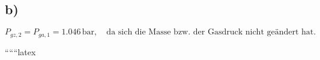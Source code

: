 

\subsection*{b)}

\[
P_{gz,2} = P_{ga,1} = 1.046 \, \text{bar}, \quad \text{da sich die Masse bzw. der Gasdruck nicht geändert hat.}
\]

``````latex